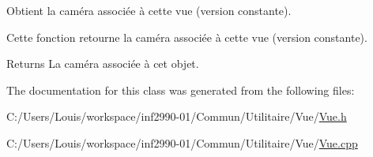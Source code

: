 Obtient la caméra associée à cette vue (version constante). 

Cette fonction retourne la caméra associée à cette vue (version constante).

\begin{DoxyReturn}{Returns}
La caméra associée à cet objet. 
\end{DoxyReturn}


The documentation for this class was generated from the following files\+:\begin{DoxyCompactItemize}
\item 
C\+:/\+Users/\+Louis/workspace/inf2990-\/01/\+Commun/\+Utilitaire/\+Vue/\hyperlink{_vue_8h}{Vue.\+h}\item 
C\+:/\+Users/\+Louis/workspace/inf2990-\/01/\+Commun/\+Utilitaire/\+Vue/\hyperlink{_vue_8cpp}{Vue.\+cpp}\end{DoxyCompactItemize}
